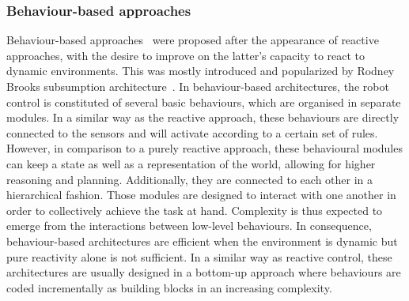 

    \subsubsection{Behaviour-based approaches}

      Behaviour-based approaches~\parencite{Arkin1998a} were proposed after the appearance of reactive approaches, with the desire to improve on the latter's capacity to react to dynamic environments. This was mostly introduced and popularized by Rodney Brooks subsumption architecture~\parencite{Brooks1986}. In behaviour-based architectures, the robot control is constituted of several basic behaviours, which are organised in separate modules. In a similar way as the reactive approach, these behaviours are directly connected to the sensors and will activate according to a certain set of rules. However, in comparison to a purely reactive approach, these behavioural modules can keep a state as well as a representation of the world, allowing for higher reasoning and planning. Additionally, they are connected to each other in a hierarchical fashion.   Those modules are designed to interact with one another in order to collectively achieve the task at hand. Complexity is thus expected to emerge from the interactions between low-level behaviours. In consequence, behaviour-based architectures are efficient when the environment is dynamic but pure reactivity alone is not sufficient. In a similar way as reactive control, these architectures are usually designed in a bottom-up approach where behaviours are coded incrementally as building blocks in an increasing complexity. 

